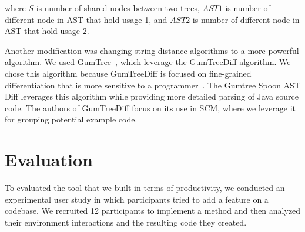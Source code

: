 \documentclass[conference]{IEEEtran}
\begin{document}
where $S$ is number of shared nodes between two trees, $AST1$ is number of different node in AST that hold usage 1, and $AST2$ is number of different node in AST that hold usage 2. \par
Another modification was changing string distance algorithms to a more powerful algorithm. We used GumTree~\cite{baxter1998clone,DBLP:conf/kbse/FalleriMBMM14,falleri2014fine}, which leverage the GumTreeDiff algorithm. We chose this algorithm because GumTreeDiff is focused on fine-grained differentiation that is more sensitive to a programmer~\cite{falleri2014fine}. The Gumtree Spoon AST Diff leverages this algorithm while providing more detailed parsing of Java source code. The authors of GumTreeDiff focus on its use in SCM, where we leverage it for grouping potential example code. \par











\section{Evaluation}
To evaluated the tool that we built in terms of productivity, we conducted an experimental user study in which participants tried to add a feature on a codebase. We recruited 12 participants to implement a method and then analyzed their environment interactions and the resulting code they created. 
\end{document}
